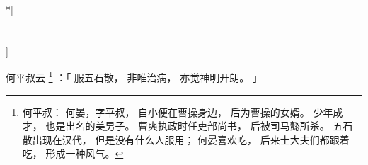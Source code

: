 
\switchcolumn[0]*[\section{}]

何平叔云%
\footnote{%
    何平叔：
        何晏，字平叔，
        自小便在曹操身边，
        后为曹操的女婿。
        少年成才，
        也是出名的美男子。
        曹爽执政时任吏部尚书，
        后被司马懿所杀。
        五石散出现在汉代，
        但是没有什么人服用；
        何晏喜欢吃，
        后来士大夫们都跟着吃，
        形成一种风气。
}%
：「
    服五石散，
    非唯治病，
    亦觉神明开朗。
」

\switchcolumn


